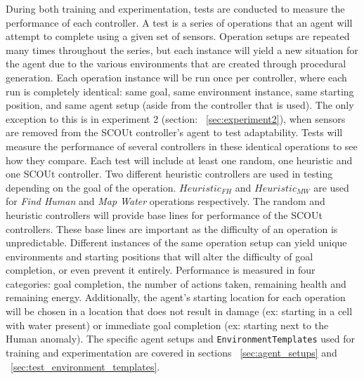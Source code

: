 During both training and experimentation, tests are conducted to measure the performance of each controller.
A test is a series of operations that an agent will attempt to complete using a given set of sensors.
Operation setups are repeated many times throughout the series, but each instance will yield a new situation for the agent due to the various environments that are created through procedural generation.
Each operation instance will be run once per controller, where each run is completely identical: same goal, same environment instance, same starting position, and same agent setup (aside from the controller that is used).
The only exception to this is in experiment 2 (section: ~\ref{sec:experiment2}), when sensors are removed from the SCOUt controller's agent to test adaptability.
Tests will measure the performance of several controllers in these identical operations to see how they compare.
Each test will include at least one random, one heuristic and one SCOUt controller.
Two different heuristic controllers are used in testing depending on the goal of the operation.
$Heuristic_{FH}$ and $Heuristic_{MW}$ are used for \textit{Find Human} and \textit{Map Water} operations respectively.
The random and heuristic controllers will provide base lines for performance of the SCOUt controllers.
These base lines are important as the difficulty of an operation is unpredictable.
Different instances of the same operation setup can yield unique environments and starting positions that will alter the difficulty of goal completion, or even prevent it entirely.
Performance is measured in four categories: goal completion, the number of actions taken, remaining health and remaining energy.
Additionally, the agent's starting location for each operation will be chosen in a location that does not result in damage (ex: starting in a cell with water present) or immediate goal completion (ex: starting next to the Human anomaly).
The specific agent setups and \texttt{EnvironmentTemplates} used for training and experimentation are covered in sections ~\ref{sec:agent_setups} and ~\ref{sec:test_environment_templates}.


